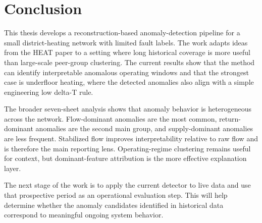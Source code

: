 \section{Conclusion}

This thesis develops a reconstruction-based anomaly-detection pipeline for a small district-heating network with limited fault labels. The work adapts ideas from the HEAT paper to a setting where long historical coverage is more useful than large-scale peer-group clustering. The current results show that the method can identify interpretable anomalous operating windows and that the strongest case is underfloor heating, where the detected anomalies also align with a simple engineering low delta-T rule.

The broader seven-sheet analysis shows that anomaly behavior is heterogeneous across the network. Flow-dominant anomalies are the most common, return-dominant anomalies are the second main group, and supply-dominant anomalies are less frequent. Stabilized flow improves interpretability relative to raw flow and is therefore the main reporting lens. Operating-regime clustering remains useful for context, but dominant-feature attribution is the more effective explanation layer.

The next stage of the work is to apply the current detector to live data and use that prospective period as an operational evaluation step. This will help determine whether the anomaly candidates identified in historical data correspond to meaningful ongoing system behavior.
